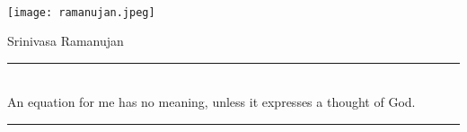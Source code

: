 \documentclass{beamer}
\begin{document}
	\

	\begin{frame}[plain]
	\begin{center}
		\texttt{[image: ramanujan.jpeg]}\\
		\textcolor{CD}{\Large{Srinivasa Ramanujan} \\ \rule{\linewidth}{2pt}}\\[5pt]
		\normalsize An equation for me has no meaning, unless it expresses a thought of God.\\ \textcolor{CD}{\rule{\linewidth}{2pt}}
	\end{center}
	\end{frame}
\end{document}
